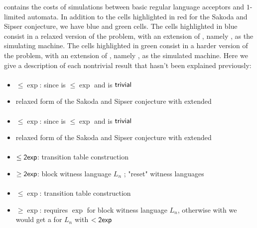  contains the costs of simulations between basic regular language acceptors and $1$-limited automata.
In addition to the cells highlighted in red for the Sakoda and Sipser conjecture, we have blue and green cells.
The cells highlighted in blue consist in a relaxed version of the problem, with an extension of \TNFA, namely \ODLA, as the simulating machine.
The cells highlighted in green consist in a harder version of the problem, with an extension of \NFA, namely \OLA, as the simulated machine.
Here we give a description of each nontrivial result that hasn't been explained previously:

\paragraph{\ONFA{}\tto\ODLA}
\begin{itemize}
	\item $\le\exp$: since \hyperref[cost:1NFAto1DFA]{\ONFA{}\tto\ODFA} is $\le\exp$ and \ODFA{}\tto\ODLA is $\mathsf{trivial}$
	\item relaxed form of the Sakoda and Sipser conjecture with extended \TDFA
\end{itemize}
\paragraph{\TNFA{}\tto\ODLA}
\begin{itemize}
	\item $\le\exp$: since \hyperref[cost:2NFAto1DFA]{\TNFA{}\tto\ODFA} is $\le\exp$ and \ODFA{}\tto\ODLA is $\mathsf{trivial}$
	\item relaxed form of the Sakoda and Sipser conjecture with extended \TDFA
\end{itemize}
\paragraph{\OLA{}\tto\ODFA}\label{cost:1LAto1DFA}
\begin{itemize}
	\item $\le\mathsf{2exp}$: transition table construction \cite{PigPis14}
	\item $\ge\mathsf{2exp}$: block witness language $L_n$ \cite{PigPis14}; "reset" witness languages \cite{PigPri+22}
\end{itemize}
\paragraph{\OLA{}\tto\ONFA}\label{cost:1LAto1NFA}
\begin{itemize}
	\item $\le\exp$: transition table construction \cite{PigPis14}
	\item $\ge\exp$: \ONFA requires $\exp$ for block witness language $L_n$, otherwise with \hyperref[cost:1NFAto1DFA]{\ONFA{}\tto\ODFA} we would get a \ODFA for $L_n$ with $<\mathsf{2exp}$ \cite{PigPis14}
\end{itemize}
